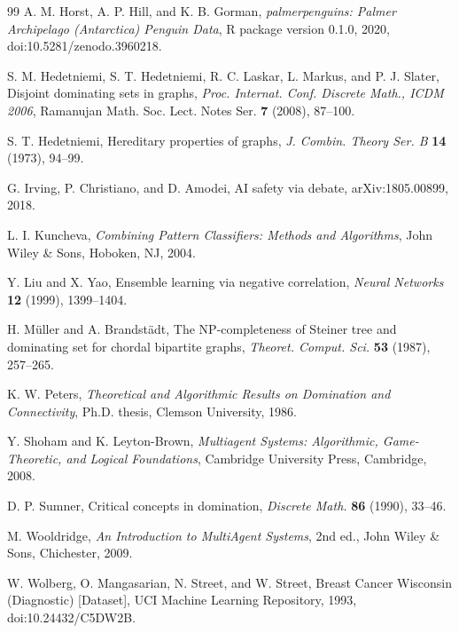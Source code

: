 \documentclass[11pt]{article}
\theoremstyle{definition}
\theoremstyle{remark}
\begin{document}
\begin{thebibliography}{99}
A. M. Horst, A. P. Hill, and K. B. Gorman,
\emph{palmerpenguins: Palmer Archipelago (Antarctica) Penguin Data},
R package version 0.1.0, 2020,
doi:10.5281/zenodo.3960218.

S. M. Hedetniemi, S. T. Hedetniemi, R. C. Laskar, L. Markus, and P. J. Slater,
Disjoint dominating sets in graphs,
\emph{Proc. Internat. Conf. Discrete Math., ICDM 2006},
Ramanujan Math. Soc. Lect. Notes Ser. \textbf{7} (2008), 87--100.

S. T. Hedetniemi,
Hereditary properties of graphs,
\emph{J. Combin. Theory Ser. B} \textbf{14} (1973), 94--99.

G. Irving, P. Christiano, and D. Amodei,
AI safety via debate,
arXiv:1805.00899, 2018.

L. I. Kuncheva,
\emph{Combining Pattern Classifiers: Methods and Algorithms},
John Wiley \& Sons, Hoboken, NJ, 2004.

Y. Liu and X. Yao,
Ensemble learning via negative correlation,
\emph{Neural Networks} \textbf{12} (1999), 1399--1404.

H. M\"uller and A. Brandst\"adt,
The NP-completeness of Steiner tree and dominating set for chordal bipartite
graphs,
\emph{Theoret. Comput. Sci.} \textbf{53} (1987), 257--265.

K. W. Peters,
\emph{Theoretical and Algorithmic Results on Domination and Connectivity},
Ph.D. thesis, Clemson University, 1986.

Y. Shoham and K. Leyton-Brown,
\emph{Multiagent Systems: Algorithmic, Game-Theoretic, and Logical
Foundations},
Cambridge University Press, Cambridge, 2008.

D. P. Sumner,
Critical concepts in domination,
\emph{Discrete Math.} \textbf{86} (1990), 33--46.

M. Wooldridge,
\emph{An Introduction to MultiAgent Systems},
2nd ed., John Wiley \& Sons, Chichester, 2009.

W. Wolberg, O. Mangasarian, N. Street, and W. Street,
Breast Cancer Wisconsin (Diagnostic) [Dataset],
UCI Machine Learning Repository, 1993,
doi:10.24432/C5DW2B.

\end{thebibliography}
\end{document}

